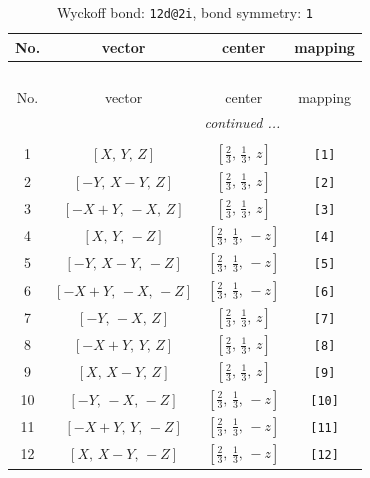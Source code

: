 \documentclass[fleqn,8pt]{jsarticle}
\begin{document}
\begin{longtable}{cccc}
\caption{Wyckoff bond: {\tt 12d@2i}, bond symmetry: {\tt 1}}
 \\
 \hline \hline
No. & vector & center & mapping \\ \hline \endfirsthead

\multicolumn{3}{l}{\tablename\ \thetable{}} \\
 \hline \hline
No. & vector & center & mapping \\ \hline \endhead

 \hline \hline
\multicolumn{3}{r}{\footnotesize\it continued ...} \\ \endfoot

 \hline \hline
\multicolumn{3}{r}{} \\ \endlastfoot

1 & $\left[ X,\, Y,\, Z \right]$ & $\left[ \frac{2}{3},\, \frac{1}{3},\, z \right]$ & {\tt [1]} \\ \hline
2 & $\left[ - Y,\, X - Y,\, Z \right]$ & $\left[ \frac{2}{3},\, \frac{1}{3},\, z \right]$ & {\tt [2]} \\ \hline
3 & $\left[ - X + Y,\, - X,\, Z \right]$ & $\left[ \frac{2}{3},\, \frac{1}{3},\, z \right]$ & {\tt [3]} \\ \hline
4 & $\left[ X,\, Y,\, - Z \right]$ & $\left[ \frac{2}{3},\, \frac{1}{3},\, - z \right]$ & {\tt [4]} \\ \hline
5 & $\left[ - Y,\, X - Y,\, - Z \right]$ & $\left[ \frac{2}{3},\, \frac{1}{3},\, - z \right]$ & {\tt [5]} \\ \hline
6 & $\left[ - X + Y,\, - X,\, - Z \right]$ & $\left[ \frac{2}{3},\, \frac{1}{3},\, - z \right]$ & {\tt [6]} \\ \hline
7 & $\left[ - Y,\, - X,\, Z \right]$ & $\left[ \frac{2}{3},\, \frac{1}{3},\, z \right]$ & {\tt [7]} \\ \hline
8 & $\left[ - X + Y,\, Y,\, Z \right]$ & $\left[ \frac{2}{3},\, \frac{1}{3},\, z \right]$ & {\tt [8]} \\ \hline
9 & $\left[ X,\, X - Y,\, Z \right]$ & $\left[ \frac{2}{3},\, \frac{1}{3},\, z \right]$ & {\tt [9]} \\ \hline
10 & $\left[ - Y,\, - X,\, - Z \right]$ & $\left[ \frac{2}{3},\, \frac{1}{3},\, - z \right]$ & {\tt [10]} \\ \hline
11 & $\left[ - X + Y,\, Y,\, - Z \right]$ & $\left[ \frac{2}{3},\, \frac{1}{3},\, - z \right]$ & {\tt [11]} \\ \hline
12 & $\left[ X,\, X - Y,\, - Z \right]$ & $\left[ \frac{2}{3},\, \frac{1}{3},\, - z \right]$ & {\tt [12]} \\
\end{longtable}
\end{document}
